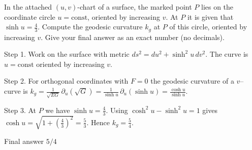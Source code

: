 In the attached $(u,v)$-chart of a surface, the marked point $P$ lies on the coordinate circle $u=\text{const}$, oriented by increasing $v$. At $P$ it is given that $\sinh u=\tfrac{4}{3}$. Compute the geodesic curvature $k_{g}$ at $P$ of this circle, oriented by increasing $v$. Give your final answer as an exact number (no decimals).


Step 1. Work on the surface with metric $ds^{2}=du^{2}+\sinh^{2}u\,dv^{2}$. The curve is $u=\text{const}$ oriented by increasing $v$.

Step 2. For orthogonal coordinates with $F=0$ the geodesic curvature of a $v$–curve is $k_g=\tfrac{1}{\sqrt{EG}}\,\partial_u(\sqrt{G})=\tfrac{1}{\sinh u}\,\partial_u(\sinh u)=\tfrac{\cosh u}{\sinh u}$.

Step 3. At $P$ we have $\sinh u=\tfrac{4}{3}$. Using $\cosh^{2}u-\sinh^{2}u=1$ gives $\cosh u=\sqrt{1+\left(\tfrac{4}{3}\right)^{2}}=\tfrac{5}{3}$. Hence $k_g=\tfrac{5}{4}$.

Final answer $5/4$
